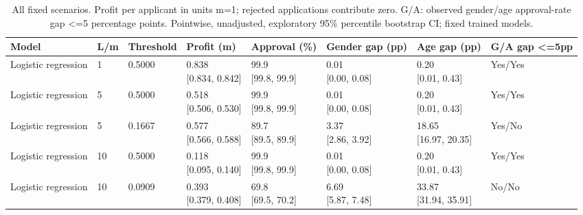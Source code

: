 \begingroup
\scriptsize
\setlength{\tabcolsep}{3pt}
\begin{longtable}{llllllll}
\caption{All fixed scenarios. Profit per applicant in units m=1; rejected applications contribute zero. G/A: observed gender/age approval-rate gap <=5 percentage points. Pointwise, unadjusted, exploratory 95\% percentile bootstrap CI; fixed trained models.}\label{tab:profit-fairness-all}\\
\toprule
Model & L/m & Threshold & Profit (m) & Approval (\%) & Gender gap (pp) & Age gap (pp) & G/A gap <=5pp \\
\midrule
Logistic regression & 1 & 0.5000 & \shortstack{{0.838} \\ {[0.834, 0.842]}} & \shortstack{{99.9} \\ {[99.8, 99.9]}} & \shortstack{{0.01} \\ {[0.00, 0.08]}} & \shortstack{{0.20} \\ {[0.01, 0.43]}} & Yes/Yes \\
Logistic regression & 5 & 0.5000 & \shortstack{{0.518} \\ {[0.506, 0.530]}} & \shortstack{{99.9} \\ {[99.8, 99.9]}} & \shortstack{{0.01} \\ {[0.00, 0.08]}} & \shortstack{{0.20} \\ {[0.01, 0.43]}} & Yes/Yes \\
Logistic regression & 5 & 0.1667 & \shortstack{{0.577} \\ {[0.566, 0.588]}} & \shortstack{{89.7} \\ {[89.5, 89.9]}} & \shortstack{{3.37} \\ {[2.86, 3.92]}} & \shortstack{{18.65} \\ {[16.97, 20.35]}} & Yes/No \\
Logistic regression & 10 & 0.5000 & \shortstack{{0.118} \\ {[0.095, 0.140]}} & \shortstack{{99.9} \\ {[99.8, 99.9]}} & \shortstack{{0.01} \\ {[0.00, 0.08]}} & \shortstack{{0.20} \\ {[0.01, 0.43]}} & Yes/Yes \\
Logistic regression & 10 & 0.0909 & \shortstack{{0.393} \\ {[0.379, 0.408]}} & \shortstack{{69.8} \\ {[69.5, 70.2]}} & \shortstack{{6.69} \\ {[5.87, 7.48]}} & \shortstack{{33.87} \\ {[31.94, 35.91]}} & No/No \\

\end{longtable}
